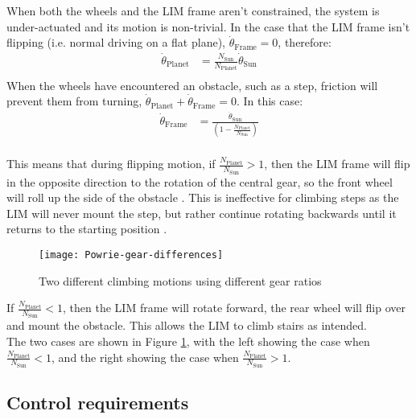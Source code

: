 When both the wheels and the LIM frame aren't constrained, the system is under-actuated and its motion is non-trivial. In the case that the LIM frame isn't flipping (i.e. normal driving on a flat plane), $\dot{\theta}_{\mathrm{Frame}} = 0$, therefore:\\
 \begin{align*}
 	\dot{\theta}_{\mathrm{Planet}} &= \frac{N_\mathrm{Sun}}{N_\mathrm{Planet}}\dot{\theta}_{\mathrm{Sun}} \tag{2}\\
 \end{align*}
When the wheels have encountered an obstacle, such as a step, friction will prevent them from turning, $\dot{\theta}_{\mathrm{Planet}} + \dot{\theta}_{\mathrm{Frame}} = 0$. In this case:
\begin{align*}
	\dot{\theta}_{\mathrm{Frame}} &= \frac{\dot{\theta}_{\mathrm{Sun}}}{(1-\frac{N_\mathrm{Planet}}{N_\mathrm{Sun}})} \tag{3}\\
\end{align*}

This means that during flipping motion, if $\frac{N_\mathrm{Planet}}{N_\mathrm{Sun}} > 1$, then the LIM frame will flip in the opposite direction to the rotation of the central gear, so the front wheel will roll up the side of the obstacle \citep{Wilson-2013}. This is ineffective for climbing steps as the LIM will never mount the step, but rather continue rotating backwards until it returns to the starting position \citep{Haskel-2017}.\\

\begin{figure}[h]
	\centering
	\texttt{[image: Powrie-gear-differences]}
	\caption{Two different climbing motions using different gear ratios \citep{Powrie-2019}}
	\label{Powrie gears}
\end{figure}

If $\frac{N_\mathrm{Planet}}{N_\mathrm{Sun}} < 1$, then the LIM frame will rotate forward, the rear wheel will flip over and mount the obstacle. This allows the LIM to climb stairs as intended.\\
The two cases are shown in Figure \ref{Powrie gears}, with the left showing the case when $\frac{N_\mathrm{Planet}}{N_\mathrm{Sun}} < 1$, and the right showing the case when $\frac{N_\mathrm{Planet}}{N_\mathrm{Sun}} > 1$.



\subsection{Control requirements} %

